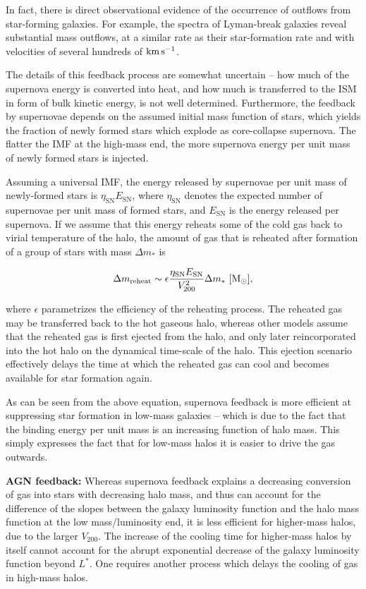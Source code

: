 \documentclass[a4paper,11pt]{article}
\begin{document}
{\noindent}In fact, there is direct observational evidence of the occurrence of outflows from star-forming galaxies. For example, the spectra of Lyman-break galaxies reveal substantial mass outflows, at a similar rate as their star-formation rate and with velocities of several hundreds of ${\rm km\,s^{-1}}$.

{\noindent}The details of this feedback process are somewhat uncertain -- how much of the supernova energy is converted into heat, and how much is transferred to the ISM in form of bulk kinetic energy, is not well determined. Furthermore, the feedback by supernovae depends on the assumed initial mass function of stars, which yields the fraction of newly formed stars which explode as core-collapse supernova. The flatter the IMF at the high-mass end, the more supernova energy per unit mass of newly formed stars is injected.

{\noindent}Assuming a universal IMF, the energy released by supernovae per unit mass of newly-formed stars is $\eta_\mathrm{SN}E_\mathrm{SN}$, where $\eta_\mathrm{SN}$ denotes the expected number of supernovae per unit mass of formed stars, and $E_\mathrm{SN}$ is the energy released per supernova. If we assume that this energy reheats some of the cold gas back to virial temperature of the halo, the amount of gas that is reheated after formation of a group of stars with mass $\Delta m_*$ is

\begin{align*}
    \Delta m_\mathrm{reheat} \sim \epsilon\frac{\eta_\mathrm{SN}E_\mathrm{SN}}{V_{200}^2}\Delta m_* ~ [{\rm M_\odot}],
\end{align*}

{\noindent}where $\epsilon$ parametrizes the efficiency of the reheating process. The reheated gas may be transferred back to the hot gaseous halo, whereas other models assume that the reheated gas is first ejected from the halo, and only later reincorporated into the hot halo on the dynamical time-scale of the halo. This ejection scenario effectively delays the time at which the reheated gas can cool and becomes available for star formation again.

{\noindent}As can be seen from the above equation, supernova feedback is more efficient at suppressing star formation in low-mass galaxies -- which is due to the fact that the binding energy per unit mass is an increasing function of halo mass. This simply expresses the fact that for low-mass halos it is easier to drive the gas outwards.

{\noindent}\textbf{AGN feedback:} Whereas supernova feedback explains a decreasing conversion of gas into stars with decreasing halo mass, and thus can account for the difference of the slopes between the galaxy luminosity function and the halo mass function at the low mass/luminosity end, it is less efficient for higher-mass halos, due to the larger $V_{200}$. The increase of the cooling time for higher-mass halos by itself cannot account for the abrupt exponential decrease of the galaxy luminosity function beyond $L^*$. One requires another process which delays the cooling of gas in high-mass halos.
\end{document}
